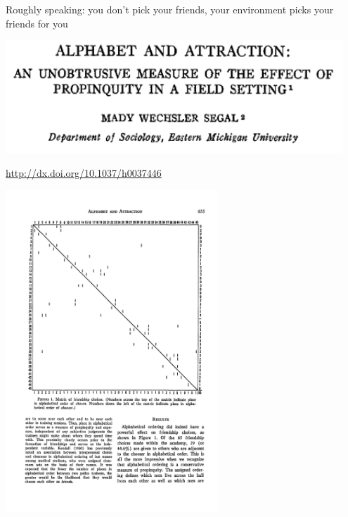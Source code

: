 \documentclass[aspectratio=169]{beamer}
\begin{document}
\begin{frame}

\begin{center}
{\Large Roughly speaking: you don't pick your friends, your environment picks your friends for you}
\end{center}

\end{frame}
\begin{frame}

\begin{center}
\includegraphics[width=0.95\textwidth]{figures/segal_alphabet_1974_title}
\end{center}

\vfill
\url{http://dx.doi.org/10.1037/h0037446}

\end{frame}
\begin{frame}

\begin{center}
\includegraphics[width=0.6\textwidth]{figures/segal_alphabet_1974_fig1}
\end{center}

\end{frame}
\end{document}
